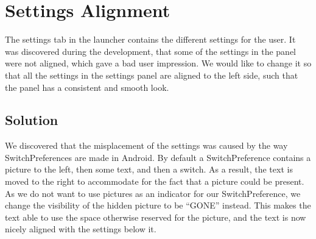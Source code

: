 \section{Settings Alignment}
\label{sec:settings_alignment}

The settings tab in the launcher contains the different settings for the user. It was discovered during the development, that some of the settings in the panel were not aligned, which gave a bad user impression. We would like to change it so that all the settings in the settings panel are aligned to the left side, such that the panel has a consistent and smooth look. 


\subsection{Solution} 
\label{sub:settings_alignment_solution}
We discovered that the misplacement of the settings was caused by the way SwitchPreferences are made in Android. By default a SwitchPreference contains a picture to the left, then some text, and then a switch. As a result, the text is moved to the right to accommodate for the fact that a picture could be present. As we do not want to use pictures as an indicator for our SwitchPreference, we change the visibility of the hidden picture to be ``GONE'' instead. This makes the text able to use the space otherwise reserved for the picture, and the text is now nicely aligned with the settings below it. 


